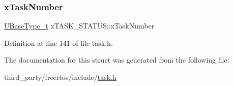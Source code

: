 \subsubsection{\texorpdfstring{x\+Task\+Number}{xTaskNumber}}
{\footnotesize\ttfamily \hyperlink{pic32mx_2portmacro_8h_a646f89d4298e4f5afd522202b11cb2e6}{U\+Base\+Type\+\_\+t} x\+T\+A\+S\+K\+\_\+\+S\+T\+A\+T\+U\+S\+::x\+Task\+Number}



Definition at line 141 of file task.\+h.



The documentation for this struct was generated from the following file\+:\begin{DoxyCompactItemize}
\item 
third\+\_\+party/freertos/include/\hyperlink{task_8h}{task.\+h}\end{DoxyCompactItemize}
